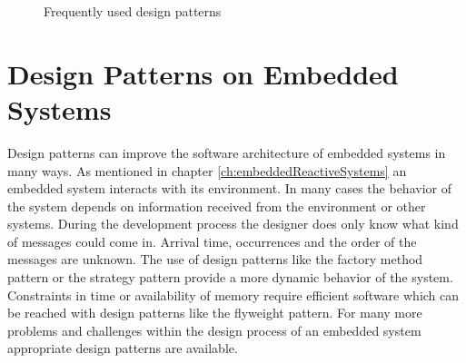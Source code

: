 {\begin{figure}[h]{}
\centering
\mbox{}
\caption{Frequently used design patterns}
\label{fig:frequentlyUsedDesignPatterns}
\end{figure}

\FloatBarrier

\section{Design Patterns on Embedded Systems}\label{sec:designPatternOnEmbeddedSystems}
\noindent Design patterns can improve the software architecture of embedded systems in many ways. As mentioned in chapter \ref{ch:embeddedReactiveSystems} an embedded system interacts with its environment. In many cases the behavior of the system depends on information received from the environment or other systems. During the development process the designer does only know what kind of messages could come in. Arrival time, occurrences and the order of the messages are unknown. The use of design patterns like the factory method pattern or the strategy pattern provide a more dynamic behavior of the system. Constraints in time or availability of memory require efficient software which can be reached with design patterns like the flyweight pattern. For many more problems and challenges within the design process of an embedded system appropriate design patterns are available.

}
